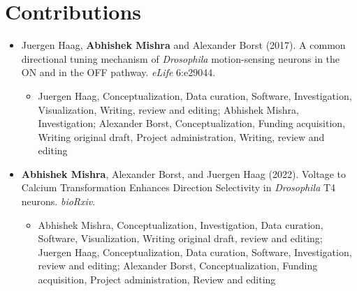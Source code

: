 \chapter*{Contributions}

\begin{itemize}
    
    \item Juergen Haag, \textbf{Abhishek Mishra} and Alexander Borst (2017). A common directional tuning mechanism of \textit{Drosophila} motion-sensing neurons in the ON and in the OFF pathway. \textit{eLife} 6:e29044.
    
    \begin{itemize}
        \item
        Juergen Haag, Conceptualization, Data curation, Software, Investigation, Visualization, Writing, review and editing; Abhishek Mishra, Investigation; Alexander Borst, Conceptualization, Funding acquisition, Writing original draft, Project administration, Writing, review and editing
    \end{itemize}
    
    \item \textbf{Abhishek Mishra}, Alexander Borst, and Juergen Haag (2022). Voltage to Calcium Transformation Enhances Direction Selectivity in \textit{Drosophila} T4 neurons. \textit{bioRxiv}.
    
    \begin{itemize}
        \item
        Abhishek Mishra, Conceptualization, Investigation, Data curation, Software, Visualization, Writing original draft, review and editing; Juergen Haag, Conceptualization, Data curation, Software, Investigation, review and editing; Alexander Borst, Conceptualization, Funding acquisition, Project administration, Review and editing
    \end{itemize}
    

\end{itemize}
